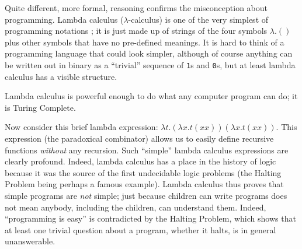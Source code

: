 \color{red}Quite different, more formal, reasoning confirms the misconception about programming. Lambda calculus ($\lambda$-calculus) is one of the very simplest of programming notations \cite{lambda}; it is just made up of strings of the four symbols $\lambda.()$ plus other symbols that have no pre-defined meanings. It is hard to think of a programming language that could look simpler, although of course anything can be written out in binary as a ``trivial'' sequence of \texttt{1}s and \texttt{0}s, but at least lambda calculus has a visible structure. 

Lambda calculus is powerful enough to do what any computer program can do; it is Turing Complete. 

Now consider this brief lambda expression: $\lambda t. (\lambda x. t (x x)) (\lambda x. t (x x))$. This expression  (the paradoxical combinator) allows us to easily define recursive functions \emph{without\/} any recursion. Such ``simple'' lambda calculus expressions are clearly profound. Indeed, lambda calculus has a place in the history of logic because it was the source of the first undecidable logic problems (the Halting Problem being perhaps a famous example). Lambda calculus thus proves that simple programs are \emph{not\/} simple; just because children can write programs does not mean anybody, including the children, can understand them. Indeed, ``programming is easy'' is contradicted by the Halting Problem, which shows that at least one trivial question about a program, whether it halts, is in general unanswerable.
\color{black}